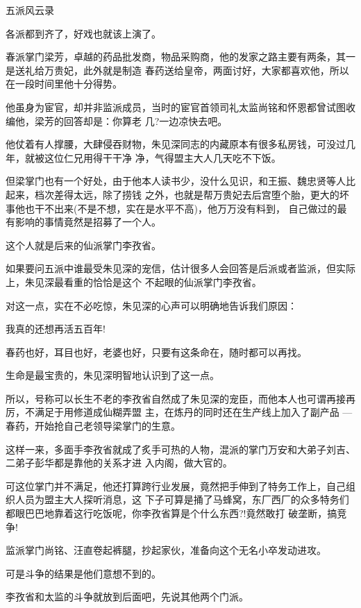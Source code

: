 \documentclass[11pt,a4paper,onecolumn]{article}
\begin{document}
五派风云录

各派都到齐了，好戏也就该上演了。

春派掌门梁芳，卓越的药品批发商，物品采购商，他的发家之路主要有两条，其一是送礼给万贵妃，此外就是制造
春药送给皇帝，两面讨好，大家都喜欢他，所以在一段时间里他十分得势。

他虽身为宦官，却并非监派成员，当时的宦官首领司礼太监尚铭和怀恩都曾试图收编他，梁芳的回答却是：你算老
几?一边凉快去吧。

他仗着有人撑腰，大肆侵吞财物，朱见深同志的内藏原本有很多私房钱，可没过几年，就被这位仁兄用得干干净
净，气得盟主大人几天吃不下饭。

但梁掌门也有一个好处，由于他本人读书少，没什么见识，和王振、魏忠贤等人比起来，档次差得太远，除了捞钱
之外，也就是帮万贵妃去后宫堕个胎，更大的坏事他也干不出来(不是不想，实在是水平不高)，他万万没有料到，
自己做过的最有影响的事情竟然是招募了一个人。

这个人就是后来的仙派掌门李孜省。

如果要问五派中谁最受朱见深的宠信，估计很多人会回答是后派或者监派，但实际上，朱见深最看重的恰恰是这个
不起眼的仙派掌门李孜省。

对这一点，实在不必吃惊，朱见深的心声可以明确地告诉我们原因：

我真的还想再活五百年!

春药也好，耳目也好，老婆也好，只要有这条命在，随时都可以再找。

生命是最宝贵的，朱见深明智地认识到了这一点。

所以，号称可以长生不老的李孜省自然成了朱见深的宠臣，而他本人也可谓再接再厉，不满足于用修道成仙糊弄盟
主，在炼丹的同时还在生产线上加入了副产品 --- 春药，开始抢自己老领导梁掌门的生意。

这样一来，多面手李孜省就成了炙手可热的人物，混派的掌门万安和大弟子刘吉、二弟子彭华都是靠他的关系才进
入内阁，做大官的。

可这位掌门并不满足，他还打算跨行业发展，竟然把手伸到了特务工作上，自己组织人员为盟主大人探听消息，这
下子可算是捅了马蜂窝，东厂西厂的众多特务们都眼巴巴地靠着这行吃饭呢，你李孜省算是个什么东西?!竟然敢打
破垄断，搞竞争!

监派掌门尚铭、汪直卷起裤腿，抄起家伙，准备向这个无名小卒发动进攻。

可是斗争的结果是他们意想不到的。

李孜省和太监的斗争就放到后面吧，先说其他两个门派。

\section[\thesection]{}
\end{document}
